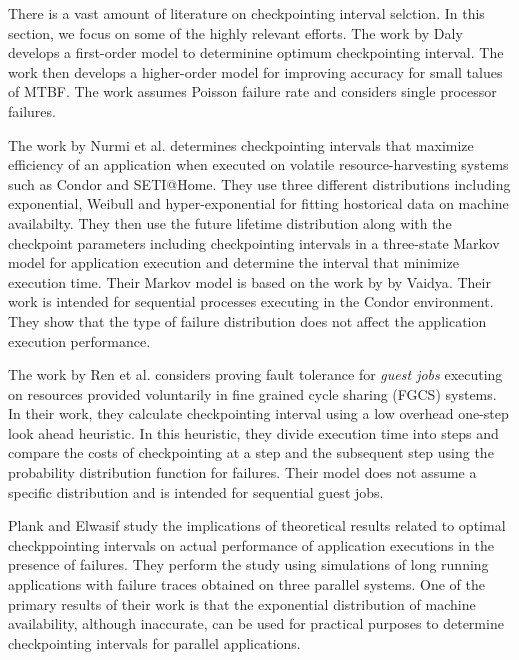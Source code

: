 \documentclass[conference,10pt]{IEEEtran}
\begin{document}
There is a vast amount of literature on checkpointing interval
selction\cite{elnozahy-survey-cmureport96}. In this section, we focus
on some of the highly relevant efforts. The work by
Daly\cite{daly-higherorder-fgcs06} develops a first-order model to
determinine optimum checkpointing interval. The work then develops a
higher-order model for improving accuracy for small talues of
MTBF. The work assumes Poisson failure rate and considers single
processor failures.

The work by Nurmi et al.\cite{nurmi-modelbased-ucsbreport04}
determines checkpointing intervals that maximize efficiency of an
application when executed on volatile resource-harvesting systems such
as Condor\cite{condor-web} and SETI@Home\cite{setiathome}. They use
three different distributions including exponential, Weibull and
hyper-exponential for fitting hostorical data on machine
availabilty. They then use the future lifetime distribution along with
the checkpoint parameters including checkpointing intervals in a
three-state Markov model for application execution and determine the
interval that minimize execution time. Their Markov model is based on
the work by by Vaidya\cite{vaidya-impact-itc97}. Their work is
intended for sequential processes executing in the Condor
environment. They show that the type of failure distribution does not
affect the application execution performance.

The work by Ren et al.\cite{ren-failureaware-hpdc07} considers proving
fault tolerance for {\em guest jobs} executing on resources provided
voluntarily in fine grained cycle sharing (FGCS) systems. In their
work, they calculate checkpointing interval using a low overhead
one-step look ahead heuristic. In this heuristic, they divide
execution time into steps and compare the costs of checkpointing at a
step and the subsequent step using the probability distribution
function for failures. Their model does not assume a specific
distribution and is intended for sequential guest jobs.

Plank and Elwasif\cite{plank-experimentalassessment-ftcs98} study the
implications of theoretical results related to optimal checkppointing
intervals on actual performance of application executions in the
presence of failures. They perform the study using simulations of long
running applications with failure traces obtained on three parallel
systems. One of the primary results of their work is that the
exponential distribution of machine availability, although inaccurate,
can be used for practical purposes to determine checkpointing
intervals for parallel applications. 
\end{document}
